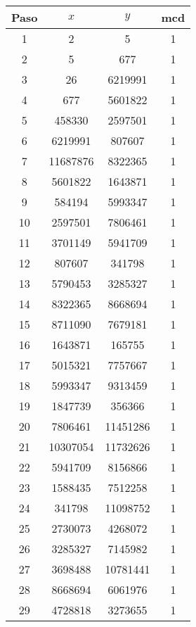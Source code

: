 \documentclass[fleqn]{article}
\begin{document}
    \begin{center}
        \begin{tabular}{| c | c | c | c |}
            \hline Paso & $x$ & $y$ & mcd \\ \hline
            1 & 2 & 5 & 1 \\
            2 & 5 & 677 & 1 \\
            3 & 26 & 6219991 & 1 \\
            4 & 677 & 5601822 & 1 \\
            5 & 458330 & 2597501 & 1 \\
            6 & 6219991 & 807607 & 1 \\
            7 & 11687876 & 8322365 & 1 \\
            8 & 5601822 & 1643871 & 1 \\
            9 & 584194 & 5993347 & 1 \\
            10 & 2597501 & 7806461 & 1 \\
            11 & 3701149 & 5941709 & 1 \\
            12 & 807607 & 341798 & 1 \\
            13 & 5790453 & 3285327 & 1 \\
            14 & 8322365 & 8668694 & 1 \\
            15 & 8711090 & 7679181 & 1 \\
            16 & 1643871 & 165755 & 1 \\
            17 & 5015321 & 7757667 & 1 \\
            18 & 5993347 & 9313459 & 1 \\
            19 & 1847739 & 356366 & 1 \\
            20 & 7806461 & 11451286 & 1 \\
            21 & 10307054 & 11732626 & 1 \\
            22 & 5941709 & 8156866 & 1 \\
            23 & 1588435 & 7512258 & 1 \\
            24 & 341798 & 11098752 & 1 \\
            25 & 2730073 & 4268072 & 1 \\
            26 & 3285327 & 7145982 & 1 \\
            27 & 3698488 & 10781441 & 1 \\
            28 & 8668694 & 6061976 & 1 \\
            29 & 4728818 & 3273655 & 1 \\

\end{tabular}
\end{center}
\end{document}
